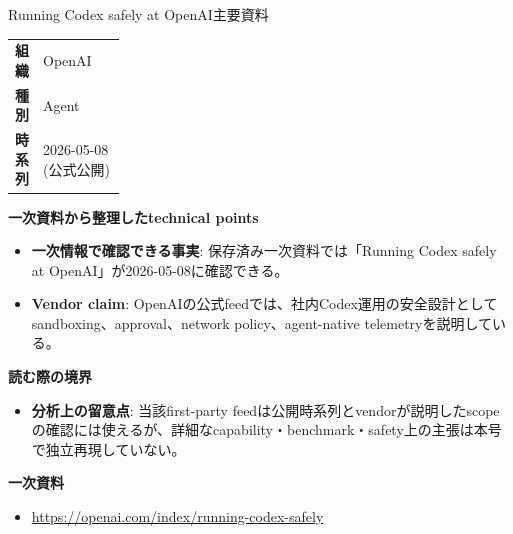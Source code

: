\begin{technicalnote}{Running Codex safely at OpenAI}{主要資料}
\begingroup
\begin{tabularx}{\linewidth}{@{}>{\bfseries}p{0.22\linewidth}X@{}}
組織 & OpenAI \\
種別 & Agent \\
時系列 & 2026-05-08 (公式公開) \\
\end{tabularx}
\smallskip
{\bfseries 一次資料から整理したtechnical points}
\begin{itemize}[leftmargin=1.5em,itemsep=0.35em]
\item \textbf{一次情報で確認できる事実}: 保存済み一次資料では「Running Codex safely at OpenAI」が2026-05-08に確認できる。
\end{itemize}
\begin{minipage}{\linewidth}
\begin{itemize}[leftmargin=1.5em,itemsep=0.35em]
\item \textbf{Vendor claim}: OpenAIの公式feedでは、社内Codex運用の安全設計としてsandboxing、approval、network policy、agent-native telemetryを説明している。
\end{itemize}
{\bfseries 読む際の境界}
\begin{itemize}[leftmargin=1.5em,itemsep=0.35em]
\item \textbf{分析上の留意点}: 当該first-party feedは公開時系列とvendorが説明したscopeの確認には使えるが、詳細なcapability・benchmark・safety上の主張は本号で独立再現していない。
\end{itemize}
\begin{samepage}
{\bfseries 一次資料}
\begingroup\sloppy
\begin{itemize}[leftmargin=1.5em,itemsep=0.25em]
\item {\scriptsize\url{https://openai.com/index/running-codex-safely}}
\end{itemize}
\endgroup
\end{samepage}
\end{minipage}
\endgroup
\end{technicalnote}
\medskip

